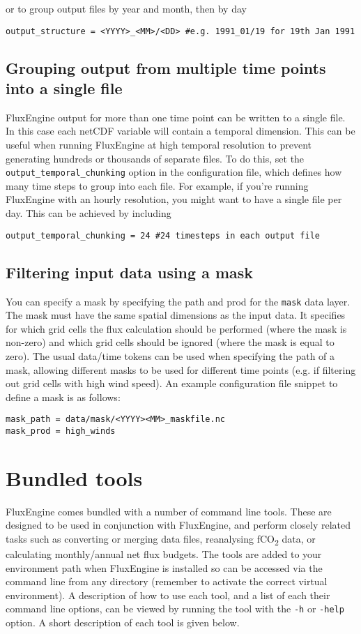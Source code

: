 \documentclass[]{scrartcl}
\begin{document}
{or to group output files by year and month, then by day
\begin{lstlisting}
output_structure = <YYYY>_<MM>/<DD> #e.g. 1991_01/19 for 19th Jan 1991
\end{lstlisting}

\subsection{Grouping output from multiple time points into a single file} \label{output_chunking}
FluxEngine output for more than one time point can be written to a single file. In this case each netCDF variable will contain a temporal dimension. This can be useful when running FluxEngine at high temporal resolution to prevent generating hundreds or thousands of separate files. To do this, set the \texttt{output\_temporal\_chunking} option in the configuration file, which defines how many time steps to group into each file. For example, if you're running FluxEngine with an hourly resolution, you might want to have a single file per day. This can be achieved by including
\begin{lstlisting}
output_temporal_chunking = 24 #24 timesteps in each output file
\end{lstlisting}

\subsection{Filtering input data using a mask}
You can specify a mask by specifying the path and prod for the \texttt{mask} data layer. The mask must have the same spatial dimensions as the input data. It specifies for which grid cells the flux calculation should be performed (where the mask is non-zero) and which grid cells should be ignored (where the mask is equal to zero). The usual data/time tokens can be used when specifying the path of a mask, allowing different masks to be used for different time points (e.g. if filtering out grid cells with high wind speed). An example configuration file snippet to define a mask is as follows:
\begin{lstlisting}
mask_path = data/mask/<YYYY><MM>_maskfile.nc
mask_prod = high_winds
\end{lstlisting}



\section{Bundled tools} \label{tools}
FluxEngine comes bundled with a number of command line tools. These are designed to be used in conjunction with FluxEngine, and perform closely related tasks such as converting or merging data files, reanalysing fCO\textsubscript{2} data, or calculating monthly/annual net flux budgets. The tools are added to your environment path when FluxEngine is installed so can be accessed via the command line from any directory (remember to activate the correct virtual environment). A description of how to use each tool, and a list of each their command line options, can be viewed by running the tool with the \texttt{-h} or \texttt{-help} option. A short description of each tool is given below.

}
\end{document}
